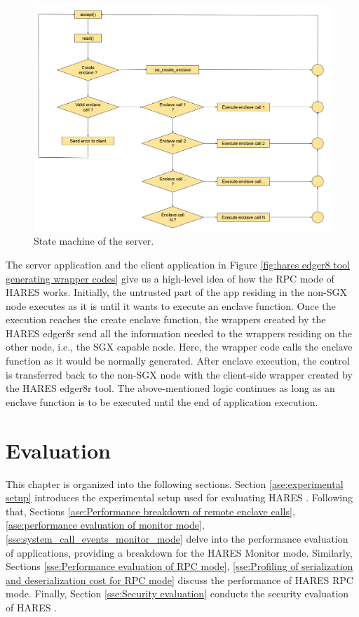 \documentclass[article, doublespace,nopageskip]{VTthesis} %
\newcommand{\monitor}{HARES }
\begin{document}
    \begin{figure}[htb]
        \includegraphics[scale=0.3]{figures/server_state_machine.png}
        \caption{State machine of the server.} 
        \label{fig:server_state_machine}
    \end{figure}
    
    The server application and the client application in Figure \ref{fig:hares edger8 tool generating wrapper codes} give us a high-level idea of how the RPC mode of \monitor works. Initially, the untrusted part of the app residing in the non-SGX node executes as it is until it wants to execute an enclave function. Once the execution reaches the create enclave function, the wrappers created by the \monitor edger8r send all the information needed to the wrappers residing on the other node, i.e., the SGX capable node. Here, the wrapper code calls the enclave function as it would be normally generated. After enclave execution, the control is transferred back to the non-SGX node with the client-side wrapper created by the \monitor edger8r tool. The above-mentioned logic continues as long as an enclave function is to be executed until the end of application execution. 

    \chapter{Evaluation} \label{Evaluation}
    This chapter is organized into the following sections. Section \ref{ase:experimental setup} introduces the experimental setup used for evaluating \monitor. Following that, Sections \ref{ase:Performance breakdown of remote enclave calls}, \ref{ase:performance evaluation of monitor mode}, \ref{sse:system_call_events_monitor_mode} delve into the performance evaluation of applications, providing a breakdown for the \monitor Monitor mode. Similarly, Sections \ref{sse:Performance evaluation of RPC mode}, \ref{sse:Profiling of serialization and deserialization cost for RPC mode} discuss the performance of \monitor RPC mode. Finally, Section \ref{sse:Security evaluation} conducts the security evaluation of \monitor.
    
\end{document}

